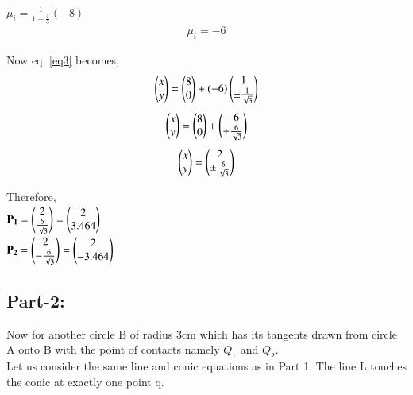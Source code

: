 \documentclass[journal,12pt,twocolumn]{IEEEtran}
\begin{document}
$\mu_i=\frac{1}{1+\frac{1}{3}}(-8)$\\
\vspace{0.25cm}
\begin{align}
\mu_i=-6
\label{eq14}
\end{align}
\vspace{0.25cm}
\raggedright{Now eq. \eqref{eq3} becomes,}\\
\vspace{0.25cm}
\centering
\begin{align}
\begin{pmatrix}x \\ y\end{pmatrix} = \begin{pmatrix}8\\0\end{pmatrix} + (-6)  \begin{pmatrix}1 \\ \pm \frac{1}{\sqrt{3}}\end{pmatrix}
\label{eq15}
\end{align}  
\vspace{0.25cm}
\begin{align}
\begin{pmatrix}x \\ y\end{pmatrix} = \begin{pmatrix}8\\0\end{pmatrix} + \begin{pmatrix}-6 \\ \pm \frac{6}{\sqrt{3}}\end{pmatrix}
\label{eq16}
\end{align}  
\vspace{0.25cm}
\begin{align}
\begin{pmatrix}x \\ y\end{pmatrix} = \begin{pmatrix}2 \\ \pm \frac{6}{\sqrt{3}}\end{pmatrix}
\label{eq17}
\end{align}  
\vspace{0.25cm}
\raggedright
Therefore,\\
\vspace{0.25cm}
\centering
$ \mathbf{P_1} = \begin{pmatrix}2 \\ \frac{6}{\sqrt{3}}\end{pmatrix} = \begin{pmatrix}2\\3.464\end{pmatrix} $\\
\vspace{0.25cm}
$ \mathbf{P_2} = \begin{pmatrix}2 \\ -\frac{6}{\sqrt{3}}\end{pmatrix} = \begin{pmatrix}2\\-3.464\end{pmatrix} $\\
\raggedright{\subsection{Part-2:}}
Now for another circle B of radius 3cm which has its tangents drawn from circle A onto B with the point of contacts namely $Q_1$ and $Q_2$.\\
\vspace{0.25cm}
Let us consider the same line and conic equations as in Part 1. The line L touches the conic at exactly one point q.\\
\end{document}
